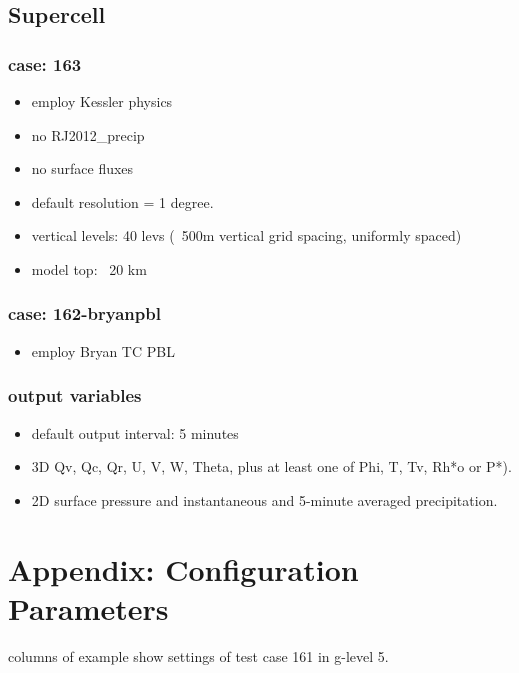 \documentclass[a4paper]{article}
\begin{document}
\subsection{Supercell}
\subsubsection{case: 163}
 \begin{itemize}
   \item employ Kessler physics
   \item no RJ2012\_precip
   \item no surface fluxes
   \item default resolution = 1 degree.
   \item vertical levels: 40 levs (~500m vertical grid spacing, uniformly spaced)
   \item model top: ~20 km
 \end{itemize}

\subsubsection{case: 162-bryanpbl}
 \begin{itemize}
   \item employ Bryan TC PBL
 \end{itemize}

\subsubsection{output variables}
 \begin{itemize}
   \item default output interval: 5 minutes
   \item 3D Qv, Qc, Qr, U, V, W, Theta, plus at least one of Phi, T, Tv, Rh*o or P*).
   \item 2D surface pressure and instantaneous and 5-minute averaged precipitation.
 \end{itemize}

\clearpage

\section{Appendix: Configuration Parameters}

 columns of example show settings of test case 161 in g-level 5.
\end{document}

